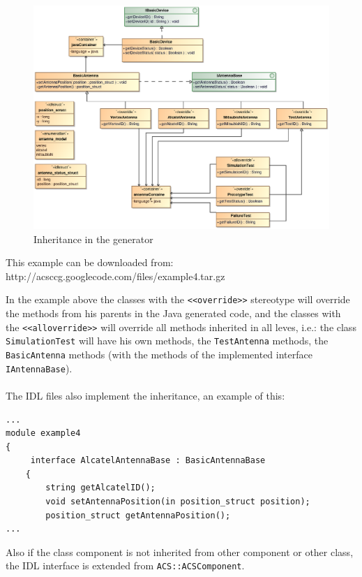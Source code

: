 \begin{figure}[h!t]
\begin{center}
\includegraphics[scale=0.88]{images/example4}
\caption{\label{fig:vs_diag}Inheritance in the generator}
\end{center}
\end{figure}

This example can be downloaded from:
http://acsccg.googlecode.com/files/example4.tar.gz

In the example above the classes with the  \verb+<<override>>+ stereotype will
override the methods from his parents in the Java generated code, and the
classes with the  \verb+<<alloverride>>+ will override all methods inherited in all
leves, i.e.: the class  \verb+SimulationTest+ will have his own methods, the 
\verb+TestAntenna+ methods, the  \verb+BasicAntenna+ methods (with the methods
of the implemented interface  \verb+IAntennaBase+).\\
\\
The IDL files also implement the inheritance, an example of this:
\begin{center}
\begin{verbatim}
...
module example4
{
     interface AlcatelAntennaBase : BasicAntennaBase  
    {
        string getAlcatelID();
        void setAntennaPosition(in position_struct position);
        position_struct getAntennaPosition();
...
\end{verbatim}
\end{center}
Also if the class component is not inherited from other component or other
class, the IDL interface is extended from \verb+ACS::ACSComponent+.

